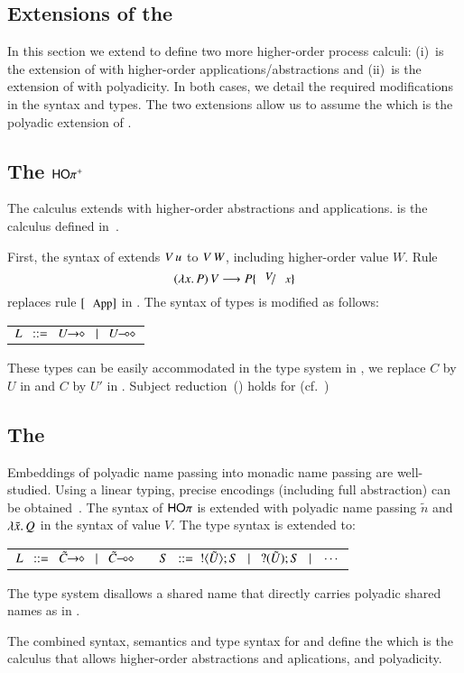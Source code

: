 
\subsection{Extensions of the \HOp}


In this section we extend \HOp to define two more higher-order
process calculi:
(i)~\HOpp is the extension of \HOp with higher-order applications/abstractions
and 
(ii)~\PHOp is the extension of \HOp
with polyadicity.
In both cases, we detail the
required modifications in the syntax and types.
The two extensions allow us to assume the \PHOpp
which is the polyadic extension of \HOpp.


\subsection{The  $\mathsf{HO\pi^{+}}$}
\noi 
The calculus \HOpp 
extends \HOp with higher-order abstractions and applications.
\HOpp is the calculus defined in~\cite{characteristic_bis}.

\noi First, the syntax of  extends 
$V\, {u}$ to $V\, {W}$, including higher-order value $W$. 
Rule 
\[
	\appl{(\abs{x}{P})}{V} \red P \subst{V}{x}
\]
replaces rule $\orule{App}$ in .
The syntax of types is modified as follows: %
%
\begin{center}
	\begin{tabular}{c}
		$L \bnfis \shot{U} \bnfbar \lhot{U}$
	\end{tabular}
\end{center}
These types can be easily accommodated in the type system in , 
we replace $C$ by $U$ in  and $C$ by $U'$ in . Subject
reduction~() holds for \HOpp (cf.~\cite{characteristic_bis})

\subsection{The \PHOp}

\noi Embeddings of polyadic name passing into monadic name passing are
well-studied. %
Using a linear typing, precise
encodings (including full abstraction) can be obtained~\cite{Yoshida96}.
The syntax of 
$\mathsf{HO}\pi$ is extended with
polyadic name passing $\tilde{n}$ and $\lambda \tilde{x}.\,Q$ in the syntax 
of value $V$. The type syntax is extended to: 
%
\begin{center}
	\begin{tabular}{c}
	$	L \bnfis \shot{\tilde{C}} \bnfbar \lhot{\tilde{C}}
		\quad\quad
		S \bnfis  \btout{\tilde{U}} S \bnfbar \btinp{\tilde{U}} S \bnfbar \cdots$
	\end{tabular}
\end{center}
%
The type system disallows a shared name that directly carries polyadic
shared names as in \cite{tlca07,MostrousY15}.

The combined syntax, semantics and type syntax for \HOpp and \PHOp
define the \PHOpp which is the calculus that allows higher-order
abstractions and aplications, and polyadicity.

